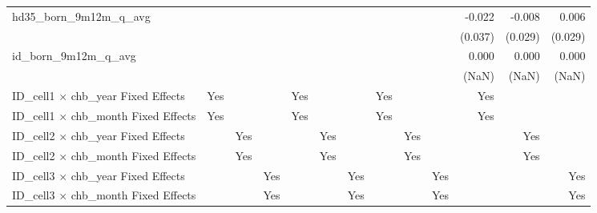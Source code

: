 \begin{tabular}{lrrrrrrrrrrrr}
hd35\_born\_9m12m\_q\_avg                   &              &              &              &              &              &              &              &              &              &       -0.022 &       -0.008 &        0.006 \\ 
                                            &              &              &              &              &              &              &              &              &              &      (0.037) &      (0.029) &      (0.029) \\ 
id\_born\_9m12m\_q\_avg                     &              &              &              &              &              &              &              &              &              &        0.000 &        0.000 &        0.000 \\ 
                                            &              &              &              &              &              &              &              &              &              &        (NaN) &        (NaN) &        (NaN) \\ 
\midrule
ID\_cell1 $\times$ chb\_year Fixed Effects  &          Yes &              &              &          Yes &              &              &          Yes &              &              &          Yes &              &              \\ 
ID\_cell1 $\times$ chb\_month Fixed Effects &          Yes &              &              &          Yes &              &              &          Yes &              &              &          Yes &              &              \\ 
ID\_cell2 $\times$ chb\_year Fixed Effects  &              &          Yes &              &              &          Yes &              &              &          Yes &              &              &          Yes &              \\ 
ID\_cell2 $\times$ chb\_month Fixed Effects &              &          Yes &              &              &          Yes &              &              &          Yes &              &              &          Yes &              \\ 
ID\_cell3 $\times$ chb\_year Fixed Effects  &              &              &          Yes &              &              &          Yes &              &              &          Yes &              &              &          Yes \\ 
ID\_cell3 $\times$ chb\_month Fixed Effects &              &              &          Yes &              &              &          Yes &              &              &          Yes &              &              &          Yes \\ 

\end{tabular}
